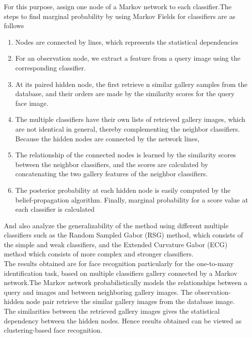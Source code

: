   For this purpose, assign one node of a Markov network to each classifier.The steps to find marginal probability by using Markov Fields for classifiers are as follows
  \begin{enumerate}
    \item Nodes are connected by lines, which represents the statistical dependencies
    \item For an observation node, we extract a feature from a query image using the corresponding classifier.
    \item At its paired hidden node,  the first retrieve n similar gallery samples from the database, and their orders are made by the similarity scores for the query face image.
  \item The multiple classifiers have their own lists of retrieved gallery images, which are not identical in general, thereby complementing the neighbor classifiers. Because the hidden nodes are connected by the network lines,
  \item The relationship of the connected nodes is learned by the similarity scores between the neighbor classifiers, and the scores are calculated by concatenating the two gallery features of the neighbor classifiers.
  \item The posterior probability at each hidden node is easily computed by the belief-propagation algorithm. Finally, marginal probability for a score value at each classifier is calculated
  \end{enumerate}
 And also analyze the generalizability of the method using different multiple classifiers such as the Random Sampled Gabor (RSG) method, which consists of the simple and weak classifiers, and the Extended Curvature Gabor (ECG) method which consists of more complex and stronger classifiers.
\\The results obtained are for face recognition particularly for the one-to-many identification task, based on multiple classifiers gallery connected by a Markov network.The Markov network probabilistically models the relationships between a query and images and between neighboring gallery images.
The observation-hidden node pair retrieve the  similar gallery images from the database image.
\\The similarities between the retrieved gallery images gives the statistical dependency between the hidden nodes. Hence results obtained can be viewed as clustering-based face recognition.



